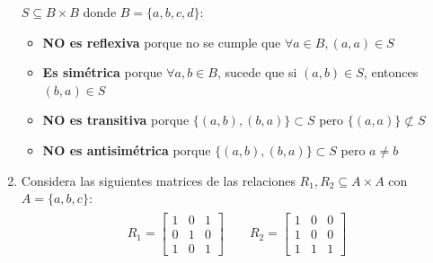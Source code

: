\documentclass[11pt,letterpaper]{article}
\begin{document}
\begin{enumerate}
        $S \subseteq B \times B$ donde $B = \{a, b, c, d\}$:
        \begin{itemize}
            \item \textbf{NO es reflexiva} porque no se cumple que $\forall a \in B, (a, a) \in S$
            \item \textbf{Es simétrica} porque $\forall a, b \in B$, sucede que si $(a, b) \in S$, entonces $(b, a) \in S$
            \item \textbf{NO es transitiva} porque $\{(a, b), (b, a)\} \subset S$ pero $\{(a, a)\} \not\subset S$
            \item \textbf{NO es antisimétrica} porque $\{(a, b), (b, a)\} \subset S$ pero $a \neq b$
        \end{itemize}

    \clearpage
    \item Considera las siguientes matrices de las relaciones $R_1, R_2 \subseteq A \times A$ con $A = \{a, b, c\}$:
        \begin{equation*} \begin{split} \begin{gathered}
            R_1 = \begin{bmatrix}
                1 & 0 & 1 \\
                0 & 1 & 0 \\
                1 & 0 & 1
            \end{bmatrix} \qquad
            R_2 = \begin{bmatrix}
                1 & 0 & 0 \\
                1 & 0 & 0 \\
                1 & 1 & 1
            \end{bmatrix}
        \end{gathered} \end{split} \end{equation*} \\


\end{enumerate}
\end{document}
